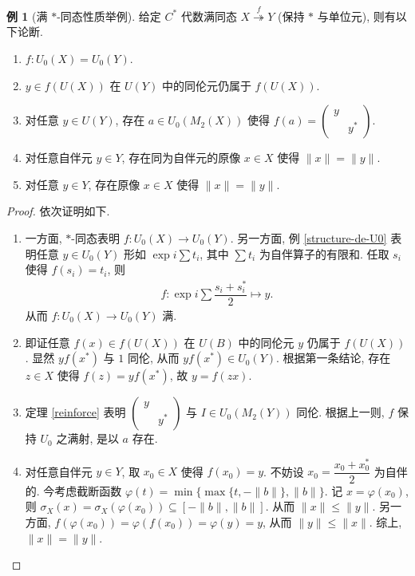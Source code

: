 \documentclass{MainStyle}
\theoremstyle{definition}
\newtheorem{example}{例}
\theoremstyle{definition}
\theoremstyle{definition}
\theoremstyle{definition}
\theoremstyle{definition}
\theoremstyle{definition}
\theoremstyle{definition}
\theoremstyle{remark}
\theoremstyle{remark}
\begin{document}
\begin{example}[满 $\ast$-同态性质举例]
    给定 $C^\ast$ 代数满同态 $X\overset{f}{\twoheadrightarrow} Y$ (保持 $\ast$ 与单位元), 则有以下论断.
    \begin{enumerate}
        \item $f: U_0(X) =U_0(Y)$.
        \item $y\in f(U(X))$ 在 $U(Y)$ 中的同伦元仍属于 $f(U(X))$.
        \item 对任意 $y\in U(Y)$, 存在 $a\in U_0(M_2(X))$ 使得 $f(a)=\begin{pmatrix} y&\\&y^\ast\end{pmatrix}$.
        \item 对任意自伴元 $y\in Y$, 存在同为自伴元的原像 $x\in X$ 使得 $\|x\|=\|y\|$.
        \item 对任意 $y\in Y$, 存在原像 $x\in X$ 使得 $\|x\|=\|y\|$.
    \end{enumerate}
    \begin{proof}
        依次证明如下.
        \begin{enumerate}
            \item 一方面, $\ast$-同态表明 $f:U_0(X)\to U_0(Y)$. 另一方面, 例 \ref{structure-de-U0} 表明任意 $y\in U_0(Y)$ 形如 $\exp i\sum t_i$, 其中 $\sum t_i$ 为自伴算子的有限和. 任取 $s_i$ 使得 $f(s_i)=t_i$, 则 \begin{align*}
                      f:\exp i\sum \dfrac{s_i+s_i^\ast}{2}\mapsto y.
                  \end{align*}
                  从而 $f:U_0(X)\to U_0(Y)$ 满.
            \item 即证任意 $f(x)\in f(U(X))$ 在 $U(B)$ 中的同伦元 $y$ 仍属于 $f(U(X))$. 显然 $yf(x^\ast)$ 与 $1$ 同伦, 从而 $yf(x^\ast)\in U_0(Y)$. 根据第一条结论, 存在 $z\in X$ 使得 $f(z)=yf(x^\ast)$, 故 $y=f(zx)$.
            \item 定理 \ref{reinforce} 表明 $\begin{pmatrix}y&\\&y^\ast\end{pmatrix}$ 与 $I\in U_0(M_2(Y))$ 同伦. 根据上一则, $f$ 保持 $U_0$ 之满射, 是以 $a$ 存在.
            \item 对任意自伴元 $y\in Y$, 取 $x_0\in X$ 使得 $f(x_0)=y$. 不妨设 $x_0=\dfrac{x_0+x_0^\ast}{2}$ 为自伴的. 今考虑截断函数 $\varphi(t)=\min\{\max\{t,-\|b\|\},\|b\|\}$. 记 $x=\varphi(x_0)$, 则 $\sigma_X(x)=\sigma_X(\varphi(x_0))\subseteq [-\|b\|,\|b\|]$. 从而 $\|x\|\leq \|y\|$. 另一方面, $f(\varphi(x_0))=\varphi(f(x_0))=\varphi(y)=y$, 从而 $\|y\|\leq \|x\|$. 综上, $\|x\|=\|y\|$.

\end{enumerate}
\end{proof}
\end{example}
\end{document}
